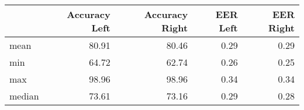 \begin{tabular}{lrrrr}
\toprule
{} &  Accuracy Left &  Accuracy Right &  EER Left &  EER Right \\
\midrule
mean   &          80.91 &           80.46 &      0.29 &       0.29 \\
min    &          64.72 &           62.74 &      0.26 &       0.25 \\
max    &          98.96 &           98.96 &      0.34 &       0.34 \\
median &          73.61 &           73.16 &      0.29 &       0.28 \\
\bottomrule
\end{tabular}
